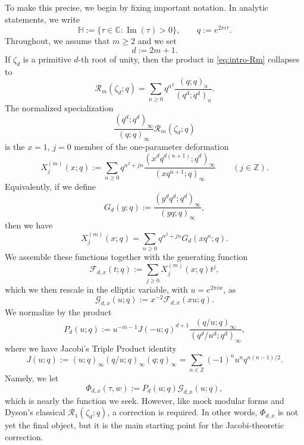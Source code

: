 \documentclass[12pt]{amsart}
\numberwithin{equation}{section}
\newcommand{\ZZ}{\mathbb Z}
\newcommand{\RRm}{\mathcal R}
\begin{document}
To make this precise, we begin by fixing important notation.
In analytic statements, we write
\[
\mathbb H := \{\tau\in\mathbb C : \operatorname{Im}(\tau)>0\},
\qquad q:=e^{2\pi i\tau}.
\]
Throughout, we assume that $m\geq 2$ and we set
\[
d:=2m+1.
\]
If \(\zeta_d\) is a primitive \(d\)-th root of unity, then the product in
\eqref{eq:intro-Rm} collapses to
$$
\RRm_m(\zeta_d;q)=
\sum_{n\geq0}q^{n^2}\frac{(q;q)_n}{(q^d;q^d)_n}.
$$
The normalized specialization
\begin{equation}\label{eq:intro-normalized-root}
\frac{(q^d;q^d)_\infty}{(q;q)_\infty}\RRm_m(\zeta_d;q)
\end{equation}
is the \(x=1\), \(j=0\) member of the one-parameter deformation
\begin{equation}\label{eq:intro-Xj}
X_j^{(m)}(x;q):=
\sum_{n\geq0}q^{n^2+jn}
\frac{(x^dq^{d(n+1)};q^d)_\infty}{(xq^{n+1};q)_\infty}
\qquad (j\in\ZZ).
\end{equation}
Equivalently, if we define
\[
G_d(y;q):=\frac{(y^dq^d;q^d)_\infty}{(yq;q)_\infty},
\]
then we have
 \[ X_j^{(m)}(x;q)=\sum_{n\geq0}q^{n^2+jn}G_d(xq^n;q).
 \]
We assemble these functions together with the
generating function
\begin{equation}\label{eq:intro-F}
\mathcal F_{d,x}(t;q):=\sum_{j\geq0}X_j^{(m)}(x;q)t^j,
\end{equation}
which we then rescale in the elliptic variable, with $u=e^{2\pi i w}$, as
\begin{equation}\label{eq:intro-G}
\mathcal G_{d,x}(u;q):=x^{-2}\mathcal F_{d,x}(xu;q).
\end{equation}
We normalize by the product
\begin{equation}\label{eq:intro-P}
P_d(u;q):=
 u^{-m-1}J(-u;q)^{d+1}\frac{(q/u;q)_\infty}{(q^d/u^d;q^d)_\infty},
 \end{equation}
 where we have Jacobi's Triple Product identity
\[
J(u;q):=(u;q)_\infty(q/u;q)_\infty(q;q)_\infty
=
\sum_{n\in\ZZ}(-1)^n u^n q^{n(n-1)/2}.
\]
 Namely, we let
\begin{equation}\label{eq:intro-Phi}
\Phi_{d,x}(\tau,w):=P_d(u;q)\mathcal G_{d,x}(u;q),
\end{equation}
which is nearly the function we seek. However, like mock modular forms and Dyson's classical $\RRm_1(\zeta_d;q)$, a correction is required.
In other words,  \(\Phi_{d,x}\) is not yet the final object, but it is the main starting point for the Jacobi-theoretic correction.  
\end{document}
